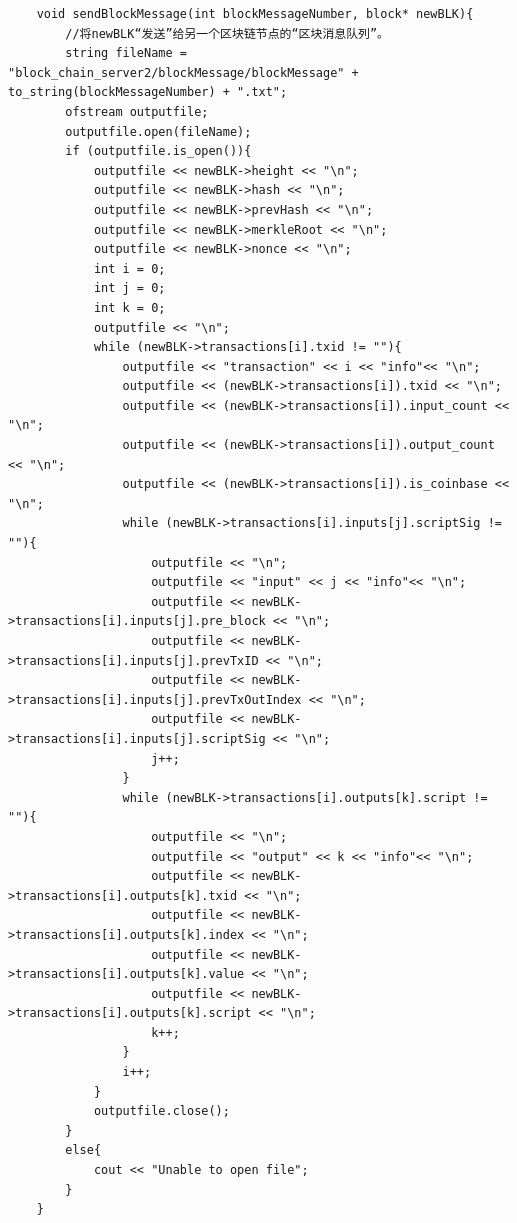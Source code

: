\documentclass[10pt,a4paper]{article}
\begin{document}
    \begin{verbatim}
    void sendBlockMessage(int blockMessageNumber, block* newBLK){
        //将newBLK“发送”给另一个区块链节点的“区块消息队列”。
        string fileName = "block_chain_server2/blockMessage/blockMessage" + to_string(blockMessageNumber) + ".txt";
        ofstream outputfile;
        outputfile.open(fileName);
        if (outputfile.is_open()){
            outputfile << newBLK->height << "\n";
            outputfile << newBLK->hash << "\n";
            outputfile << newBLK->prevHash << "\n";
            outputfile << newBLK->merkleRoot << "\n";
            outputfile << newBLK->nonce << "\n";
            int i = 0;
            int j = 0;
            int k = 0;
            outputfile << "\n";
            while (newBLK->transactions[i].txid != ""){
                outputfile << "transaction" << i << "info"<< "\n";
                outputfile << (newBLK->transactions[i]).txid << "\n";
                outputfile << (newBLK->transactions[i]).input_count << "\n";
                outputfile << (newBLK->transactions[i]).output_count << "\n";
                outputfile << (newBLK->transactions[i]).is_coinbase << "\n";
                while (newBLK->transactions[i].inputs[j].scriptSig != ""){
                    outputfile << "\n";
                    outputfile << "input" << j << "info"<< "\n";
                    outputfile << newBLK->transactions[i].inputs[j].pre_block << "\n";
                    outputfile << newBLK->transactions[i].inputs[j].prevTxID << "\n";
                    outputfile << newBLK->transactions[i].inputs[j].prevTxOutIndex << "\n";
                    outputfile << newBLK->transactions[i].inputs[j].scriptSig << "\n";
                    j++;
                }
                while (newBLK->transactions[i].outputs[k].script != ""){
                    outputfile << "\n";
                    outputfile << "output" << k << "info"<< "\n";
                    outputfile << newBLK->transactions[i].outputs[k].txid << "\n";
                    outputfile << newBLK->transactions[i].outputs[k].index << "\n";
                    outputfile << newBLK->transactions[i].outputs[k].value << "\n";
                    outputfile << newBLK->transactions[i].outputs[k].script << "\n";
                    k++;
                }
                i++;
            }
            outputfile.close();
        }
        else{
            cout << "Unable to open file";
        }
    }
    \end{verbatim}
\end{document}
